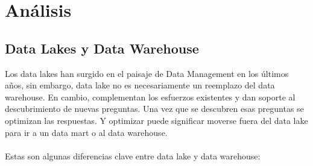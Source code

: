 \documentclass[11pt,a4paper]{article}
\begin{document}
			
		\section{Análisis}

		 \subsection{Data Lakes y Data Warehouse}


		Los data lakes han surgido en el paisaje de Data Management en los últimos años, sin embargo, data lake no es necesariamente un reemplazo del data warehouse. En cambio, complementan los esfuerzos existentes y dan soporte al descubrimiento de nuevas preguntas. Una vez que se descubren esas preguntas se optimizan las respuestas. Y optimizar puede significar moverse fuera del data lake para ir a un data mart o al data warehouse.\\
		\\
		Estas son algunas diferencias clave entre data lake y data warehouse:
		
\end{document}
